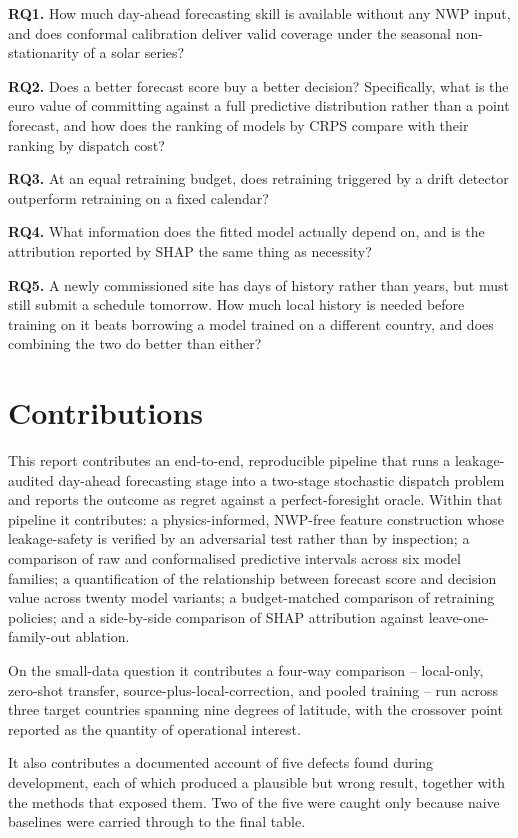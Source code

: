 \documentclass[11pt,a4paper,oneside]{report}
\begin{document}
\textbf{RQ1.} How much day-ahead forecasting skill is available without any NWP input, and does conformal calibration deliver valid coverage under the seasonal non-stationarity of a solar series?

\textbf{RQ2.} Does a better forecast score buy a better decision? Specifically, what is the euro value of committing against a full predictive distribution rather than a point forecast, and how does the ranking of models by CRPS compare with their ranking by dispatch cost?

\textbf{RQ3.} At an equal retraining budget, does retraining triggered by a drift detector outperform retraining on a fixed calendar?

\textbf{RQ4.} What information does the fitted model actually depend on, and is the attribution reported by SHAP the same thing as necessity?

\textbf{RQ5.} A newly commissioned site has days of history rather than years, but must still submit a schedule tomorrow. How much local history is needed before training on it beats borrowing a model trained on a different country, and does combining the two do better than either?

\section{Contributions}

This report contributes an end-to-end, reproducible pipeline that runs a leakage-audited day-ahead forecasting stage into a two-stage stochastic dispatch problem and reports the outcome as regret against a perfect-foresight oracle. Within that pipeline it contributes: a physics-informed, NWP-free feature construction whose leakage-safety is verified by an adversarial test rather than by inspection; a comparison of raw and conformalised predictive intervals across six model families; a quantification of the relationship between forecast score and decision value across twenty model variants; a budget-matched comparison of retraining policies; and a side-by-side comparison of SHAP attribution against leave-one-family-out ablation.

On the small-data question it contributes a four-way comparison -- local-only, zero-shot transfer, source-plus-local-correction, and pooled training -- run across three target countries spanning nine degrees of latitude, with the crossover point reported as the quantity of operational interest.

It also contributes a documented account of five defects found during development, each of which produced a plausible but wrong result, together with the methods that exposed them. Two of the five were caught only because naive baselines were carried through to the final table.
\end{document}
